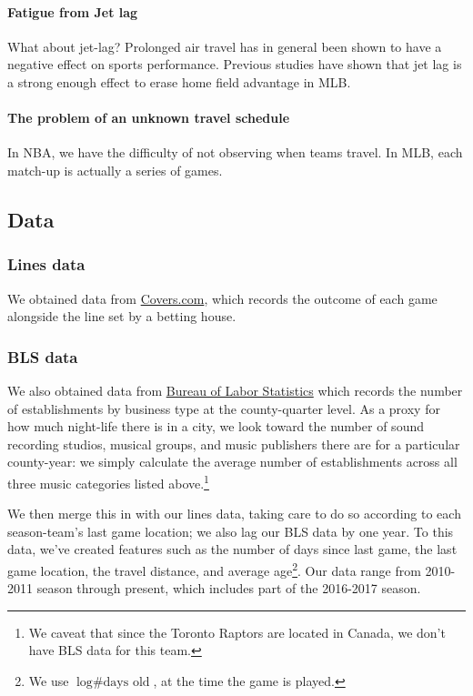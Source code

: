\documentclass[letterpaper,12pt]{article}
\begin{document}
\paragraph{Fatigue from Jet lag}
What about jet-lag? Prolonged air travel has in general been shown
to have a negative effect on sports performance.\cite{leeandgalvez}
Previous studies have shown that jet lag is a strong enough effect
to erase home field advantage in MLB.\cite{songetal}

\paragraph{The problem of an unknown travel schedule} In NBA, we have the difficulty of
not observing when teams travel. 
In MLB, each match-up is actually a series of games.


\subsection{Data}
\subsubsection{Lines data} We obtained data from \href{http://www.covers.com/sports/NBA/matchups?selectedDate=2011-1-01}{Covers.com}, which records the outcome of each game alongside the line set by a betting house.


\subsubsection{BLS data} We also obtained data from
\href{https://www.bls.gov/data/}{Bureau of Labor Statistics} which records the number of establishments by business type at the county-quarter level. As a 
proxy for how much night-life there is in a city, we look toward the 
number of sound recording studios, musical groups, and music publishers there 
are for a particular county-year: we simply calculate the average number of establishments across all three music categories listed above.\footnote{We caveat that since the Toronto Raptors are located in Canada, we don't have BLS data for this team.}

We then merge this in with our lines data, taking care to do so according to each season-team's last game location; we also lag our BLS data by one year.
To this data, we've created features such as 
the number of days since last game, the last game location, the travel distance, and
average age\footnote{We use $\log \textrm{\# days old}$, at the time the game is played.}. Our data range from 2010-2011 season through present, which includes part of the 2016-2017 season.
\end{document}

